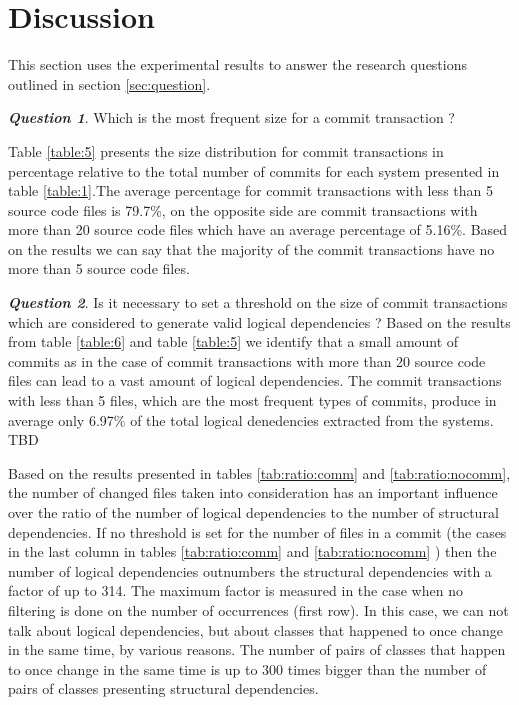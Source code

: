 \documentclass[a4paper,twoside]{article}
\begin{document}
\section{Discussion}
\label{sec:discussion}


This section uses the experimental results to answer the research questions outlined in section \ref{sec:question}.


\textit{\textbf{Question 1}}. Which is the most frequent size for a commit transaction ?  

Table \ref{table:5} presents the size distribution for commit transactions in percentage relative to the total number of commits for each system presented in table \ref{table:1}.The average percentage for commit transactions with less than 5 source code files is 79.7\%, on the opposite side are commit transactions with more than 20 source code files which have an average percentage of 5.16\%. Based on the results we can say that the majority of the commit transactions have no more than 5 source code files.

\textit{\textbf{Question 2}}. Is it necessary to set a threshold on the size of commit transactions which are considered to generate valid logical dependencies ?
Based on the results from table \ref{table:6} and table \ref{table:5} we identify that a small amount of commits as in the case of commit transactions with more than 20 source code files can lead to a vast amount of logical dependencies.  
The commit transactions with less than 5 files, which are the most frequent types of commits, produce in average only 6.97\% of the total logical denedencies extracted from the systems. TBD

Based on the results presented in tables \ref{tab:ratio:comm} and \ref{tab:ratio:nocomm}, the number 
of changed files taken into consideration has an important influence over the ratio of the number  of 
logical dependencies to the number of structural dependencies.  If no threshold is set for the number of files in a commit (the cases in the last column in tables \ref{tab:ratio:comm} and 
\ref{tab:ratio:nocomm} ) then the number of logical dependencies outnumbers the structural dependencies with a factor of up to 314. The maximum factor is measured in the case when no filtering is done on the number of occurrences (first row).  
In this case, we can not talk about logical dependencies, but about classes that happened to once change in the same time, by various reasons. The number of pairs of classes that happen to once change in the same time is up to 300 times bigger than the number of pairs of classes presenting structural dependencies.
\end{document}
